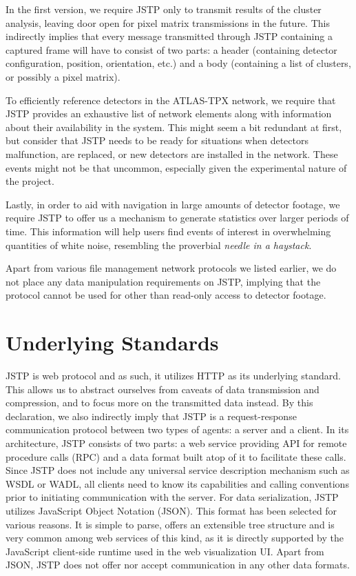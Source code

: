 In the first version, we require JSTP only to transmit results of the cluster analysis, leaving door open for pixel matrix transmissions in the future. This indirectly implies that every message transmitted through JSTP containing a captured frame will have to consist of two parts: a header (containing detector configuration, position, orientation, etc.) and a body (containing a list of clusters, or possibly a pixel matrix).

To efficiently reference detectors in the ATLAS-TPX network, we require that JSTP provides an exhaustive list of network elements along with information about their availability in the system. This might seem a bit redundant at first, but consider that JSTP needs to be ready for situations when detectors malfunction, are replaced, or new detectors are installed in the network. These events might not be that uncommon, especially given the experimental nature of the project.

Lastly, in order to aid with navigation in large amounts of detector footage, we require JSTP to offer us a mechanism to generate statistics over larger periods of time. This information will help users find events of interest in overwhelming quantities of white noise, resembling the proverbial \textit{needle in a haystack}.

Apart from various file management network protocols we listed earlier, we do not place any data manipulation requirements on JSTP, implying that the protocol cannot be used for other than read-only access to detector footage.

\section{Underlying Standards}
JSTP is web protocol and as such, it utilizes HTTP as its underlying standard. This allows us to abstract ourselves from caveats of data transmission and compression, and to focus more on the transmitted data instead. By this declaration, we also indirectly  imply that JSTP is a request-response communication protocol between two types of agents: a server and a client. In its architecture, JSTP consists of two parts: a web service providing API for remote procedure calls (RPC) and a data format built atop of it to facilitate these calls. Since JSTP does not include any universal service description mechanism such as WSDL or WADL, all clients need to know its capabilities and calling conventions prior to initiating communication with the server. For data serialization, JSTP utilizes JavaScript Object Notation (JSON). This format has been selected for various reasons. It is simple to parse, offers an extensible tree structure and is very common among web services of this kind, as it is directly supported by the JavaScript client-side runtime used in the web visualization UI. Apart from JSON, JSTP does not offer nor accept communication in any other data formats.

